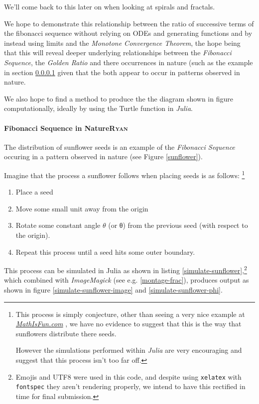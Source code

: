 \documentclass[11pt]{article}
\begin{document}
We'll come back to this later on when looking at spirals and fractals.

We hope to demonstrate this relationship between the ratio of successive terms
of the fibonacci sequence without relying on ODEs and generating functions and
by instead using limits and the \emph{Monotone Convergence Theorem}, the hope being
that this will reveal deeper underlying relationships between the \emph{Fibonacci
Sequence}, the \emph{Golden Ratio} and there occurrences in nature (such as the
example in section \ref{sunflower-example} given that the both appear to occur in
patterns observed in nature.

We also hope to find a method to produce the the diagram shown in figure
computationally, ideally by using the Turtle function in \emph{Julia}.

\paragraph{Fibonacci Sequence in Nature\hfill{}\textsc{Ryan}}
\label{sunflower-example}
The distribution of sunflower seeds is an example of the \emph{Fibonacci Sequence}
occuring in a pattern observed in nature (see Figure \ref{sunflower}).

Imagine that the process a sunflower follows when placing seeds is as follows: \footnote{This process is simply conjecture, other than seeing a very nice example at \href{https://www.mathsisfun.com/numbers/nature-golden-ratio-fibonacci.html}{\emph{MathIsFun.com}}
\cite{NatureGoldenRatio2018}, we have no evidence to suggest that this is the way
that sunflowers distribute there seeds.

However the simulations performed within \emph{Julia} are very encouraging and
suggest that this process isn't too far off.}

\begin{enumerate}
\item Place a seed
\item Move some small unit away from the origin
\item Rotate some constant angle \(\mathtt{\theta}\) (or θ) from the previous seed (with respect to the origin).
\item Repeat this process until a seed hits some outer boundary.
\end{enumerate}

This process can be simulated in Julia \cite{bezansonJuliaFreshApproach2017} as shown in listing \ref{simulate-sunflower},\footnote{Emojis and UTF8 were used in this code, and despite using \texttt{xelatex} with \texttt{fontspec} they aren't rendering properly, we intend to have this rectified in time for final submission.} which combined with \emph{ImageMagick} (see e.g. \ref{montage-frac}), produces output as shown in figure \ref{simulate-sunflower-image} and \ref{simulate-sunflower-phi}.
\end{document}
